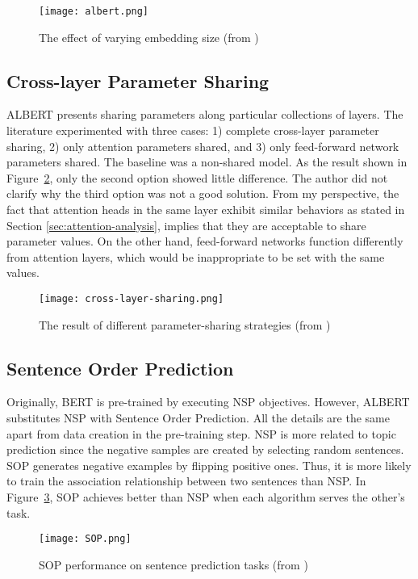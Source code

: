 \documentclass[letterpaper, 11pt]{article}
\begin{document}
\begin{figure}
    \centering
    \texttt{[image: albert.png]}
    \caption{The effect of varying embedding size (from \citet{Lan2020})}
    \label{fig:factorization}
\end{figure}

\subsection{Cross-layer Parameter Sharing}
\label{sec:cps}
ALBERT presents sharing parameters along particular collections of layers. The literature experimented with three cases: 1) complete cross-layer parameter sharing, 2) only attention parameters shared, and 3) only feed-forward network parameters shared. The baseline was a non-shared model. As the result shown in Figure~\ref{fig:parameter-sharing}, only the second option showed little difference. The author did not clarify why the third option was not a good solution. From my perspective, the fact that attention heads in the same layer exhibit similar behaviors as stated in Section \ref{sec:attention-analysis}, implies that they are acceptable to share parameter values. On the other hand, feed-forward networks function differently from attention layers, which would be inappropriate to be set with the same values.

\begin{figure}
    \centering
    \texttt{[image: cross-layer-sharing.png]}
    \caption{The result of different parameter-sharing strategies (from \citet{Lan2020})}
    \label{fig:parameter-sharing}
\end{figure}

\subsection{Sentence Order Prediction}
\label{sec:sop}
Originally, BERT is pre-trained by executing NSP objectives. However, ALBERT substitutes NSP with Sentence Order Prediction. All the details are the same apart from data creation in the pre-training step. NSP is more related to topic prediction since the negative samples are created by selecting random sentences. SOP generates negative examples by flipping positive ones. Thus, it is more likely to train the association relationship between two sentences than NSP. In Figure~\ref{fig:sop}, SOP achieves better than NSP when each algorithm serves the other's task.

\begin{figure}
    \centering
    \texttt{[image: SOP.png]}
    \caption{SOP performance on sentence prediction tasks (from \citet{Lan2020})}
    \label{fig:sop}
\end{figure}
\end{document}
